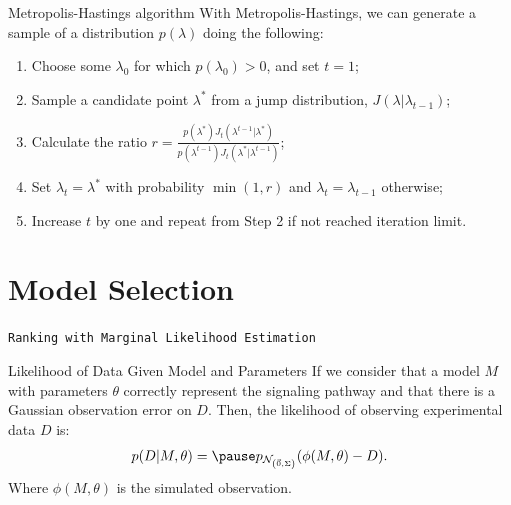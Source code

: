 \documentclass{beamer}
\begin{document}
\begin{frame}{Metropolis-Hastings algorithm}
With Metropolis-Hastings, we can generate a sample of a distribution 
$p(\lambda)$ doing the following:
\pause
    \begin{enumerate}
        \pause
        \item{Choose some $\lambda_0$ for which $p (\lambda_0) > 0$, and
            set $t = 1$;}

        \pause
        \item{Sample a candidate point $\lambda^*$ from a jump 
            distribution, $J (\lambda | \lambda_{t-1})$;}

        \pause
        \item{Calculate the ratio 
            $r = \frac{p (\lambda^*) J_t (\lambda^{t - 1} | \lambda^*)}
            {p (\lambda^{t - 1}) J_t (\lambda^* | \lambda^{t - 1})}$;}

        \pause
        \item{Set $\lambda_t = \lambda^*$ with probability $\min (1, r)$
            and $\lambda_t = \lambda_{t-1}$ otherwise;}

        \pause
        \item{Increase $t$ by one and repeat from Step 2 if not reached
            iteration limit.}
    \end{enumerate}
\end{frame}


\section{Model Selection}
\begin{frame}{}
\begin{center}
    \texttt{Ranking with Marginal Likelihood Estimation}
\end{center}
\end{frame}


\begin{frame}{Likelihood of Data Given Model and Parameters}
If we consider that a model $M$ with parameters $\theta$ correctly 
represent the signaling pathway \pause and that there is a Gaussian 
observation error on $D$.
\pause
Then, the likelihood of observing experimental data $D$ is:
\begin{equation*}
     p (D | M, \theta) = \pause 
        p_{\mathcal{N}_{\left(\vec{0}, \Sigma\right)}} 
            (\phi (M,\theta) - D).
\end{equation*}
Where $\phi (M, \theta)$ is the simulated observation.
\end{frame}
\end{document}
